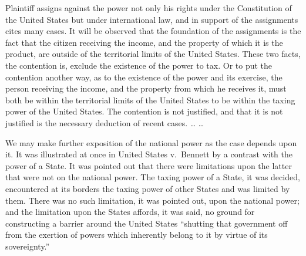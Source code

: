 \begin{select}
Plaintiff assigns against the power not only his rights under the Constitution of the United States but under international law, and in support of the assignments cites many cases. It will be observed that the foundation of the assignments is the fact that the citizen receiving the income, and the property of which it is the product, are outside of the territorial limits of the United States. These two facts, the contention is, exclude the existence of the power to tax. Or to put the contention another way, as to the existence of the power and its exercise, the person receiving the income, and the property from which he receives it, must both be within the territorial limits of the United States to be within the taxing power of the United States. The contention is not justified, and that it is not justified is the necessary deduction of recent cases. \ldots 
 \ldots

We may make further exposition of the national power as the case depends upon it. It was illustrated at once in United States v.\ Bennett by a contrast with the power of a State. It was pointed out that there were limitations upon the latter that were not on the national power. The taxing power of a State, it was decided, encountered at its borders the taxing power of other States and was limited by them. There was no such limitation, it was pointed  out, upon the national power; and the limitation upon the States affords, it was said, no ground for constructing a barrier around the United States ``shutting that government off from the exertion of powers which inherently belong to it by virtue of its sovereignty.''
 

\end{select}
